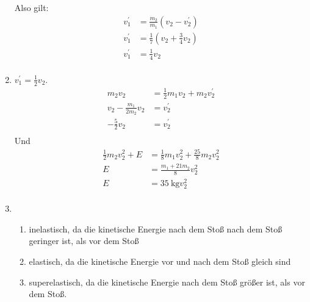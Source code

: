 \documentclass[sectionformat = aufgabe]{gadsescript}
\begin{document}
\begin{enumerate}[label=\alph*)]
		Also gilt:
		\begin{align*}
			v_1^{\prime} &= \frac{ m_2 }{ m_1 } \left( v_2 - v_2^{\prime} \right) \\
			v_1^{\prime} &= \frac{ 1 }{ 7 }  \left( v_2 + \frac{ 3 }{ 4 } v_2 \right) \\
			v_1^{\prime} &= \frac{ 1 }{ 4 }  v_2 \\
		\end{align*}
	\item $ v_1^{\prime} = \frac{ 1 }{ 2 } v_2 $.
		\begin{align*}
			m_2 v_2 &= \frac{ 1 }{ 2 } m_1 v_2 + m_2 v_2^{\prime} \\
			v_2 - \frac{ m_1 }{ 2m_2 } v_2 &= v_2^{\prime} \\
			-\frac{ 5 }{ 2 } v_2 &= v_2^{\prime} \\
		\end{align*}
		Und
		\begin{align*}
			\frac{ 1 }{ 2 } m_2 v_2^2 + E &= \frac{ 1 }{ 8 } m_1 v_2^2 + \frac{ 25 }{ 8 } m_2 v_2^2 \\
			E &= \frac{ m_1 + 21 m_2 }{ 8 } v_2^2 \\
			E &= \qty{ 35 }{ \kilogram } v_2^2 \\
		\end{align*}
	\item 
		\begin{enumerate}[label=\alph*)]
			\item inelastisch, da die kinetische Energie nach dem Stoß nach dem Stoß geringer ist, als vor dem Stoß
			\item elastisch, da die kinetische Energie vor und nach dem Stoß gleich sind
			\item superelastisch, da die kinetische Energie nach dem Stoß größer ist, als vor dem Stoß.
		\end{enumerate}
		
\end{enumerate}
\end{document}
